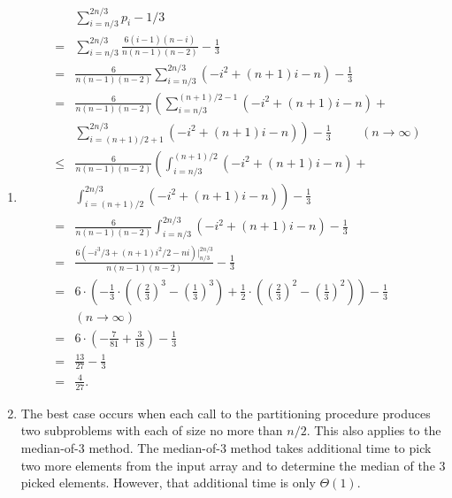 \documentclass[a4paper, fleqn]{article}
\begin{document}
\begin{enumerate}
\item  %
\begin{eqnarray*}
& & \sum_{i = n / 3}^{2n / 3} p_i - 1 / 3 \\
& = & \sum_{i = n / 3}^{2n / 3} \frac{6(i - 1)(n - i)}{n(n - 1)(n - 2)} - \frac{1}{3} \\
& = & \frac{6}{n(n - 1)(n - 2)} \sum_{i = n / 3}^{2n / 3}(-i^2 + (n + 1)i - n) - \frac{1}{3} \\
& = & \frac{6}{n(n - 1)(n - 2)} \left(\sum_{i = n / 3}^{(n + 1) / 2 - 1}(-i^2 + (n + 1)i - n) +\right. \\
&   & \left.\sum_{i = (n + 1) / 2 + 1}^{2n / 3}(-i^2 + (n + 1)i - n)\right) - \frac{1}{3} \hspace{1cm} (n \rightarrow \infty) \\
& \leq & \frac{6}{n(n - 1)(n - 2)} \left(\int_{i = n / 3}^{(n + 1) / 2}(-i^2 + (n + 1)i - n) + \right. \\
&      & \left.\int_{i = (n + 1) / 2}^{2n / 3}(-i^2 + (n + 1)i - n)\right) - \frac{1}{3} \\
& = & \frac{6}{n(n - 1)(n - 2)} \int_{i = n / 3}^{2n / 3} (-i^2 + (n + 1)i - n) - \frac{1}{3} \\
& = & \frac{6(-i^3 / 3 + (n + 1)i^2 / 2 - ni)|_{n / 3}^{2n / 3}}{n(n - 1)(n - 2)} - \frac{1}{3} \\
& = & 6 \cdot \left(-\frac{1}{3} \cdot \left(\left(\frac{2}{3}\right)^3 - \left(\frac{1}{3}\right)^3\right) + \frac{1}{2} \cdot \left(\left(\frac{2}{3}\right)^2 - \left(\frac{1}{3}\right)^2\right)\right) - \frac{1}{3} \\
&    & (n \rightarrow \infty) \\
& = & 6 \cdot \left(-\frac{7}{81} + \frac{3}{18}\right) - \frac{1}{3} \\
& = & \frac{13}{27} - \frac{1}{3} \\
& = & \frac{4}{27}.
\end{eqnarray*}



\item  %
The best case occurs when each call to the partitioning procedure produces two 
subproblems with each of size no more than $n/2$. This also applies to the 
median-of-3 method. The median-of-3 method takes additional time to pick two 
more elements from the input array and to determine the median of the 3 picked 
elements. However, that additional time is only $\Theta(1)$.

\end{enumerate}
\end{document}
